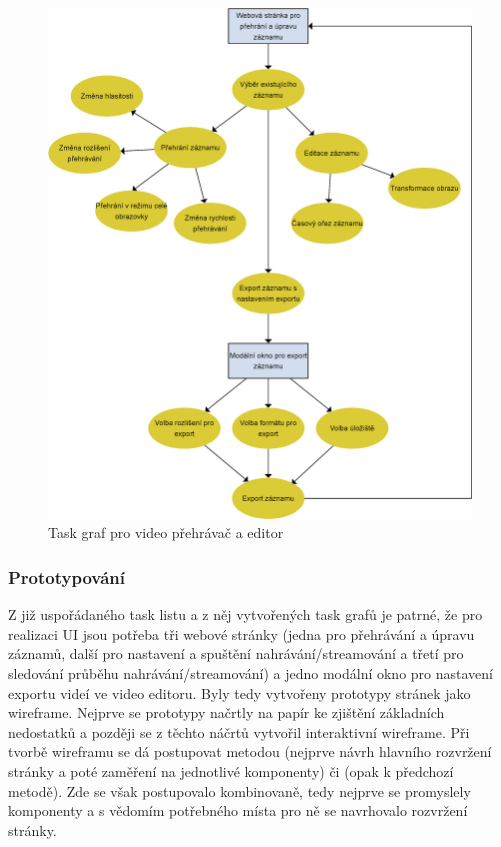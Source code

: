 \documentclass[thesis=M,czech]{FITthesis}[2012/06/26]
\begin{document}
\begin{figure}[h]\centering
	\includegraphics[width=1\textwidth]{images/ui_task_flow_2.eps}
	\caption{Task graf pro video přehrávač a editor}\label{img:navrh_frontend_ui_taskgraf_1}
\end{figure}

\subsubsection{Prototypování} \label{subsubsec:navrh_frontend_ui_proto}
Z již uspořádaného task listu a z něj vytvořených task grafů je patrné, že pro realizaci UI jsou potřeba tři webové stránky (jedna pro přehrávání a úpravu záznamů, další pro nastavení a spuštění nahrávání/streamování a třetí pro sledování průběhu nahrávání/streamování) a jedno modální okno pro nastavení exportu videí ve video editoru. Byly tedy vytvořeny prototypy stránek jako wireframe. Nejprve se prototypy načrtly na papír ke zjištění základních nedostatků a později se z těchto náčrtů vytvořil interaktivní wireframe. Při tvorbě wireframu se dá postupovat metodou  (nejprve návrh hlavního rozvržení stránky a poté zaměření na jednotlivé komponenty) či  (opak k předchozí metodě). Zde se však postupovalo kombinovaně, tedy nejprve se promyslely komponenty a s vědomím potřebného místa pro ně se navrhovalo rozvržení stránky. 
\end{document}
